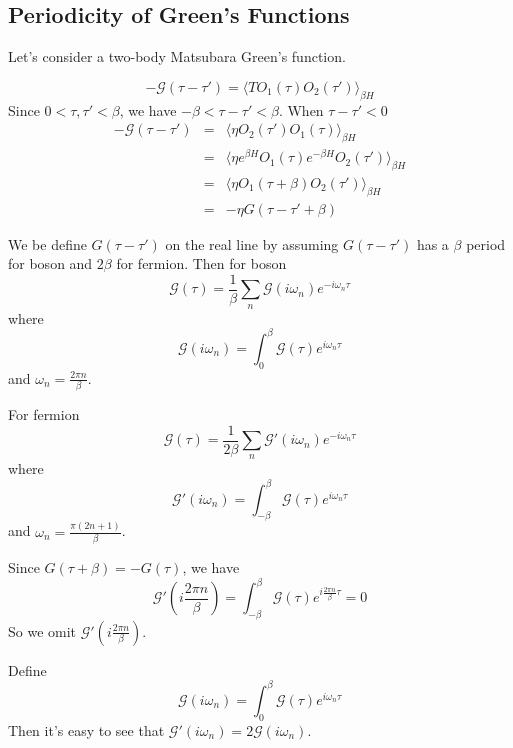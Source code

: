 \documentclass[12pt]{book}
\begin{document}
	\subsection{Periodicity of Green's Functions}
	Let's consider a two-body Matsubara Green's function.
	
	\begin{equation}
		-\mathcal G(\tau-\tau')=\langle T O_1(\tau)O_2(\tau')\rangle_{\beta H}
	\end{equation}
	Since $0<\tau,\tau'<\beta$, we have $-\beta<\tau-\tau'<\beta$. When $\tau-\tau'<0$
	\begin{eqnarray}
		-\mathcal G(\tau-\tau')&=&\langle \eta O_2(\tau')O_1(\tau)\rangle_{\beta H}\\
		&=&\langle \eta e^{\beta H}O_1(\tau)e^{-\beta H}O_2(\tau')\rangle_{\beta H}\\
		&=&\langle \eta O_1(\tau+\beta)O_2(\tau')\rangle_{\beta H}\\
		&=&-\eta G(\tau-\tau'+\beta)
	\end{eqnarray}
	
	We be define $G(\tau-\tau')$ on the real line by assuming $G(\tau-\tau')$ has a $\beta$ period for boson and $2\beta$ for fermion. Then for boson
	\begin{equation}
		\mathcal G(\tau)=\frac 1{\beta}\sum_n\mathcal G(i\omega_n)e^{-i\omega_n\tau}
	\end{equation}
	where
	\begin{equation}
		\mathcal G(i\omega_n)=\int_0^\beta\mathcal G(\tau)e^{i\omega_n\tau}
	\end{equation}
	and $\omega_n=\frac{2\pi n}{\beta}$.
	
	For fermion
	\begin{equation}
		\mathcal G(\tau)=\frac 1{2\beta}\sum_n\mathcal G'(i\omega_n)e^{-i\omega_n\tau}
	\end{equation}
	where
	\begin{equation}
		\mathcal G'(i\omega_n)=\int_{-\beta}^\beta\mathcal G(\tau)e^{i\omega_n\tau}
	\end{equation}
	and $\omega_n=\frac{\pi(2n+1)}{\beta}$.
	
	Since $G(\tau+\beta)=-G(\tau)$, we have
	\begin{equation}
		\mathcal G'(i\frac{2\pi n}{\beta})=\int_{-\beta}^\beta\mathcal G(\tau)e^{i\frac{2\pi n}{\beta}\tau}=0
	\end{equation}
	So we omit $\mathcal G'(i\frac{2\pi n}{\beta})$.
	
	Define
	\begin{equation}
		\mathcal G(i\omega_n)=\int_0^\beta\mathcal G(\tau)e^{i\omega_n\tau}
	\end{equation}
	Then it's easy to see that $\mathcal G'(i\omega_n)=2\mathcal G(i\omega_n)$.
	
\end{document}
